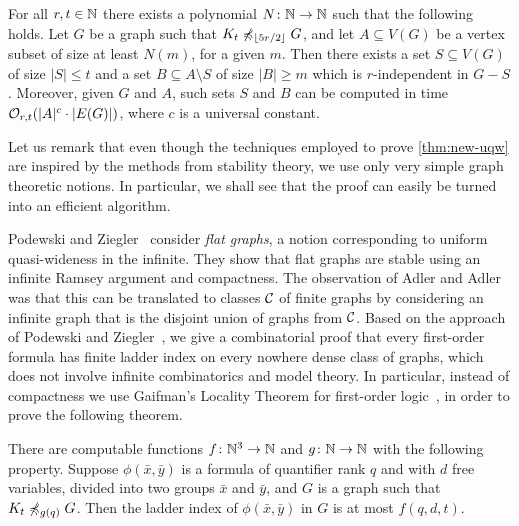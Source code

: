 \begin{theorem}\label{thm:new-uqw}
For all $r,t\in \mathbb{N}$ there exists a polynomial  $N\colon \mathbb{N}\to \mathbb{N}$ such that the following holds.
Let $G$ be a graph such that $K_t\not\preccurlyeq_{\lfloor 5r/2\rfloor} G$, and
let $A\subseteq V(G)$ be a vertex subset of size at least $N(m)$, for a given $m$.
Then there exists a set $S\subseteq V(G)$ of size $|S|\leq t$ and a set $B\subseteq A\setminus S$ 
of size $|B|\geq m$ which is $r$-independent in $G-S$.
Moreover, given $G$ and $A$, such sets $S$ and $B$ can be computed in time $\mathcal{O}_{r,t}(|A|^c\cdot |E(G)|)$, where $c$ is a universal constant.
\end{theorem}

Let us remark
that even though the techniques employed to prove \cref{thm:new-uqw} are inspired by the methods from stability theory, 
we use only very simple graph theoretic notions. In particular, we shall see that the
proof can easily be turned into an efficient algorithm.

 Podewski and Ziegler~\cite{podewski1978stable} 
consider \emph{flat graphs}, a notion corresponding to uniform quasi-wideness in the 
infinite. They show that  flat graphs are stable using an 
infinite Ramsey argument and compactness. The observation of Adler and Adler~\cite{adler2014interpreting} was that
this can be translated to classes $\mathcal{C}$ of finite graphs by considering an infinite graph that is the disjoint union of graphs from $\mathcal{C}$.
Based on the approach of Podewski and Ziegler~\cite{podewski1978stable}, we give a combinatorial 
proof that every first-order formula has finite ladder index on every
nowhere dense class of graphs, which does not involve infinite combinatorics and model theory.
In particular, instead of compactness we use Gaifman's Locality Theorem for
first-order logic~\cite{gaifman1982local}, in order to prove the following theorem.

\begin{theorem}\label{thm:new-stable}
  There are computable functions $f\colon \mathbb{N}^3\to\mathbb{N}$ and $g\colon\mathbb{N}\to\mathbb{N}$ with the following property.
Suppose $\phi(\bar x,\bar y)$ is a formula of quantifier rank $q$ and with $d$ free variables, divided into two groups $\bar x$ and $\bar y$,
and $G$ is a graph such that $K_t\not\preccurlyeq_{g(q)} G$. Then the ladder index of $\phi(\bar x,\bar y)$ in $G$ is at most $f(q,d,t)$.
\end{theorem}

%

